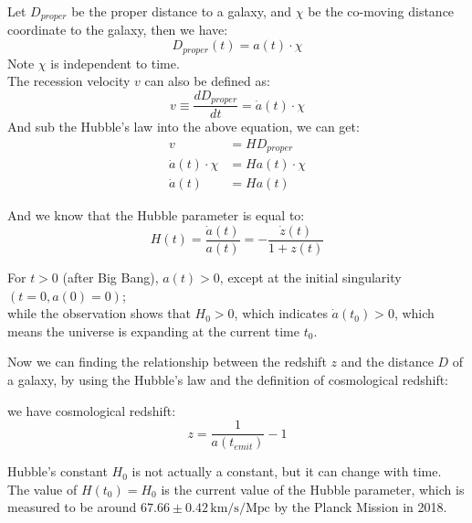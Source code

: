 \bigskip\noindent
\begin{theory}
    Let $D_{proper}$ be the proper distance to a galaxy, and $\chi$ be the co-moving distance coordinate to the galaxy, then we have:
    \[
        D_{proper}(t) = a(t) \cdot \chi
    \] 
    Note $\chi$ is independent to time.\\

    The recession velocity $v$ can also be defined as:
    \[
        v \equiv \frac{dD_{proper}}{dt} = \dot{a}(t) \cdot \chi
    \]
    And sub the Hubble's law into the above equation, we can get:
    \begin{align*}
        v &= H D_{proper} \\     
        \dot{a}(t) \cdot \chi &= H a(t) \cdot \chi \\
        \dot{a}(t) &= H a(t)
    \end{align*} 

    And we know that the Hubble parameter is equal to:
    \[
        H(t) = \frac{\dot{a}(t)}{a(t)} = - \frac{\dot{z}(t)}{1 + z(t)}
    \]
\end{theory}

\bigskip\noindent
\begin{remark}
   For $t > 0$ (after Big Bang), $a(t) > 0$, except at the initial singularity$(t = 0, a(0) = 0)$; \\
   
   while the observation shows that $H_0 > 0$, which indicates $\dot{a}(t_0) > 0$, which means the universe is expanding at the current time $t_0$.
\end{remark}

\clearpage
Now we can finding the relationship between the redshift $z$ and the distance $D$ of a galaxy, by using the Hubble's law and the definition of cosmological redshift:
\begin{theory}
    we have cosmological redshift:
    \[
        z = \frac{1}{a(t_{emit})} - 1
    \]
\end{theory}

\bigskip\noindent
\begin{importantnote}
    Hubble's constant $H_0$ is not actually a constant, but it can change with time. \\

    The value of $H(t_0) = H_0$ is the current value of the Hubble parameter, which is measured to be around $67.66 \pm 0.42 \, \mathrm{km/s/Mpc}$ by the Planck Mission in 2018.
\end{importantnote}
    
